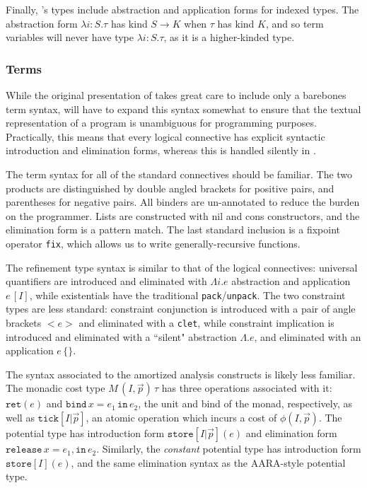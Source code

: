 Finally, \dlambdaamor's types include abstraction and application forms for indexed types. The abstraction form $\lambda i :S.\tau$ has kind $S \to K$ when $\tau$ has kind $K$, and so term variables will never have type $\lambda i : S.\tau$, as it is a higher-kinded type.

\subsubsection{Terms}
\label{}
While the original presentation of \lambdaamor takes great care to include only a barebones term syntax, \dlambdaamor will have to expand this syntax somewhat to ensure that the textual representation of a program is unambiguous for programming purposes. Practically, this means that every logical connective has explicit syntactic introduction and elimination forms, whereas this is handled silently in \lambdaamor.

The term syntax for all of the standard connectives should be familiar. The two products are distinguished by double angled brackets for positive pairs, and parentheses for negative pairs. All binders are un-annotated to reduce the burden on the programmer. Lists are constructed with nil and cons constructors, and the elimination form is a pattern match. The last standard inclusion is a fixpoint operator \texttt{fix}, which allows us to write generally-recursive functions. 

The refinement type syntax is similar to that of the logical connectives: universal quantifiers are introduced and eliminated with $\Lambda i. e$ abstraction and application $e \, [I]$, while existentials have the traditional \texttt{pack}/\texttt{unpack}. The two constraint types are less standard: constraint conjunction is introduced with a pair of angle brackets $<e>$ and eliminated with a \texttt{clet}, while constraint implication is introduced and eliminated with a ``silent" abstraction $\Lambda. e$, and eliminated with an application $e \, \{\}$.

The syntax associated to the amortized analysis constructs is likely less familiar. The monadic cost type $M \, (I,\vec{p}) \, \tau$ has three operations associated with it: $\texttt{ret}(e)$ and $\texttt{bind} \, x = e_1 \, \texttt{in}\, e_2$, the unit and bind of the monad, respectively, as well as $\texttt{tick}[I|\vec{p}]$, an atomic operation which incurs a cost of $\phi(I,\vec{p})$. The potential type has introduction form $\texttt{store}[I|\vec{p}](e)$ and elimination form $\texttt{release} \, x = e_1, \texttt{in} \, e_2$. Similarly, the \textit{constant} potential type has introduction form $\texttt{store}[I](e)$, and the same elimination syntax as the AARA-style potential type.

